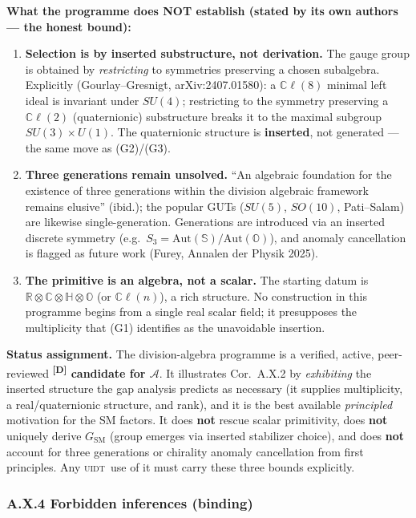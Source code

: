 \documentclass[12pt,a4paper,twoside]{article}
\theoremstyle{plain}
\theoremstyle{definition}
\theoremstyle{remark}
\newcommand{\UIDT}{\textsc{uidt}}
\newcommand{\catmark}[1]{\textsuperscript{\textsf{\textbf{[#1]}}}}
\begin{document}
\textbf{What the programme does NOT establish (stated by its own authors — the honest bound):}
\begin{enumerate}
\item \textbf{Selection is by inserted substructure, not derivation.} The gauge group is obtained by \emph{restricting} to symmetries preserving a chosen subalgebra. Explicitly (Gourlay--Gresnigt, arXiv:2407.01580): a $\mathbb{C}\ell(8)$ minimal left ideal is invariant under $SU(4)$; restricting to the symmetry preserving a $\mathbb{C}\ell(2)$ (quaternionic) substructure breaks it to the maximal subgroup $SU(3)\times U(1)$. The quaternionic structure is \textbf{inserted}, not generated — the same move as (G2)/(G3).
\item \textbf{Three generations remain unsolved.} ``An algebraic foundation for the existence of three generations within the division algebraic framework remains elusive'' (ibid.); the popular GUTs ($SU(5)$, $SO(10)$, Pati--Salam) are likewise single-generation. Generations are introduced via an inserted discrete symmetry (e.g.\ $S_3=\mathrm{Aut}(\mathbb{S})/\mathrm{Aut}(\mathbb{O})$), and anomaly cancellation is flagged as future work (Furey, Annalen der Physik 2025).
\item \textbf{The primitive is an algebra, not a scalar.} The starting datum is $\mathbb{R}\otimes\mathbb{C}\otimes\mathbb{H}\otimes\mathbb{O}$ (or $\mathbb{C}\ell(n)$), a rich structure. No construction in this programme begins from a single real scalar field; it presupposes the multiplicity that (G1) identifies as the unavoidable insertion.
\end{enumerate}

\textbf{Status assignment.} The division-algebra programme is a verified, active, peer-reviewed \textbf{\catmark{D} candidate for $\mathcal{A}$}. It illustrates Cor.\ A.X.2 by \emph{exhibiting} the inserted structure the gap analysis predicts as necessary (it supplies multiplicity, a real/quaternionic structure, and rank), and it is the best available \emph{principled} motivation for the SM factors. It does \textbf{not} rescue scalar primitivity, does \textbf{not} uniquely derive $G_{\mathrm{SM}}$ (group emerges via inserted stabilizer choice), and does \textbf{not} account for three generations or chirality anomaly cancellation from first principles. Any \UIDT\ use of it must carry these three bounds explicitly.

\subsubsection*{A.X.4 Forbidden inferences (binding)}
\end{document}
